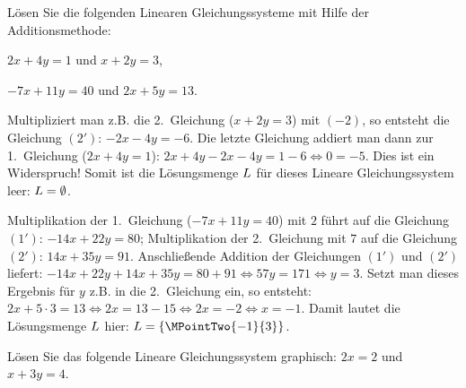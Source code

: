 \begin{MExercises}
\begin{MExercise}
Lösen Sie die folgenden Linearen Gleichungssysteme mit Hilfe der Additionsmethode:
\begin{MExerciseItems}
\item{$2 x + 4 y = 1$ und $x + 2 y = 3$,}
\item{$- 7 x + 11 y = 40$ und $2 x + 5 y = 13$.}
\end{MExerciseItems}

\begin{MHint}{\iSolution}
\begin{MExerciseItems}
\item{Multipliziert man z.B. die 2.~Gleichung ($x + 2 y = 3$) mit $(- 2)$, so entsteht die Gleichung $(2')$:
$- 2 x - 4 y = - 6$. Die letzte Gleichung addiert man dann zur 1.~Gleichung ($2 x + 4 y = 1$):
$2 x + 4 y - 2 x - 4 y = 1 - 6 \Leftrightarrow 0 = - 5$. Dies ist ein Widerspruch! Somit ist die Lösungsmenge
$L$ für dieses Lineare Gleichungssystem leer: ${L} = \emptyset$.}
\item{Multiplikation der 1.~Gleichung ($- 7 x + 11 y = 40$) mit $2$ führt auf die Gleichung $(1')$:
$- 14 x + 22 y = 80$; Multiplikation der 2.~Gleichung mit $7$ auf die Gleichung $(2')$:
$14 x + 35 y = 91$. Anschließende Addition der Gleichungen $(1')$ und $(2')$ liefert:
$- 14 x + 22 y + 14 x + 35 y = 80 + 91 \Leftrightarrow 57 y = 171 \Leftrightarrow y = 3$. Setzt man dieses
Ergebnis für $y$ z.B. in die 2.~Gleichung ein, so entsteht: $2 x + 5 \cdot 3 = 13 \Leftrightarrow
2 x = 13 - 15 \Leftrightarrow 2 x = - 2 \Leftrightarrow x = - 1$. Damit lautet die Lösungsmenge $L$ hier:
${\ML} = \{ \MPointTwo{- 1}{ 3} \}$.}
\end{MExerciseItems}
\end{MHint}
\end{MExercise}

\begin{MExercise}
Lösen Sie das folgende Lineare Gleichungssystem graphisch: $2 x = 2$ und $x + 3 y = 4$.


\end{MExercise}
\end{MExercises}
